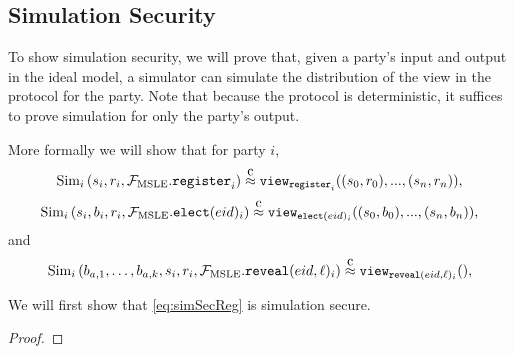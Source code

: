 \subsection{Simulation Security}
To show simulation security, we will prove that, given a party's input and output in the ideal model,
a simulator can simulate the distribution of the view in the protocol for the party. Note that because the
protocol is deterministic, it suffices to prove simulation for only the party's output.

More formally we will show that for party $i$,
\begin{equation}
	\label{eq:simSecReg}
	\simulator_i\left(s_i, r_i, \idealMSLE.\register_i\right) \compInd \texttt{view}_{\register_i}((s_0, r_0), ..., (s_n, r_n)),
\end{equation}
\begin{equation}
	\label{eq:simSecElect}
	\simulator_i\left(s_i, b_i, r_i, \idealMSLE.\elect_i\right) \compInd \texttt{view}_{\elect_i}((s_0, b_0), ..., (s_n, b_n)),
\end{equation}
and
\begin{equation}
	\label{eq:simSecReveal}
	\simulator_i\left(b_{a, 1}, \dots, b_{a, k}, s_i, r_i, \idealMSLE.\reveal_i\right) \compInd \texttt{view}_{\reveal_i}(),
\end{equation}

\begin{lemma}
	We will first show that \cref{eq:simSecReg} is simulation secure.
	\begin{proof}

	\end{proof}
\end{lemma}


